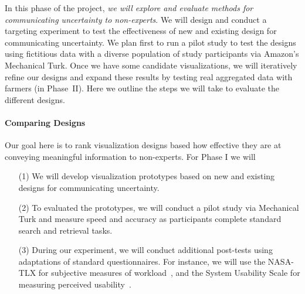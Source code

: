 In this phase of the project, \emph{we will explore and evaluate methods for communicating uncertainty to non-experts}.
We will design and conduct a targeting experiment to test the effectiveness of new and existing design for communicating uncertainty.   
We plan first to run a pilot study to test the designs using fictitious data with a diverse population of study participants via Amazon's Mechanical Turk. 
Once we have some candidate visualizations, we will iteratively refine our designs and expand these results by testing real aggregated data with farmers (in Phase~II).
Here we outline the steps we will take to evaluate the different designs.   

\paragraph{Comparing Designs} 
Our goal here is to rank visualization designs based how effective they are at conveying meaningful information to non-experts.  
For Phase I we will 
\begin{itemize}
	
\item[(1)] We will develop visualization prototypes based on new and existing designs for communicating uncertainty. 
\item[(2)] To evaluated the prototypes, we will conduct a pilot study via Mechanical Turk and measure speed and accuracy as participants complete standard search and retrieval tasks.
\item[(3)] During our experiment, we will conduct additional post-tests using adaptations of standard questionnaires. For instance, we will use the NASA-TLX for subjective measures of workload~\cite{hart1988development}, and the System Usability Scale for measuring perceived usability~\cite{bangor2008empirical}. 
\end{itemize}


